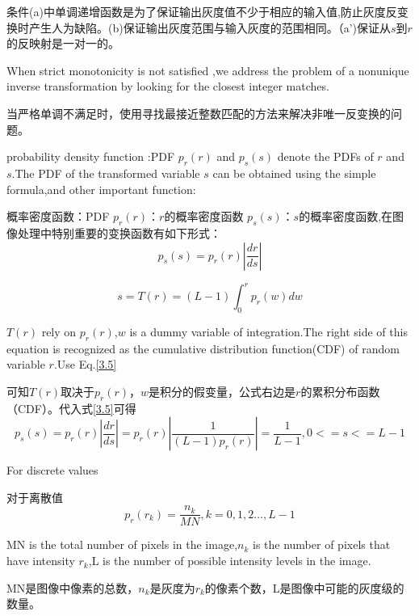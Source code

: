 \documentclass[a4paper,12pt]{article}
\numberwithin{equation}{section}%
\begin{document}
条件(a)中单调递增函数是为了保证输出灰度值不少于相应的输入值,防止灰度反变换时产生人为缺陷。(b)保证输出灰度范围与输入灰度的范围相同。（a')保证从$s$到$r$的反映射是一对一的。

When strict monotonicity is not satisfied ,we address the problem of a nonunique inverse transformation by looking for the closest integer matches.

当严格单调不满足时，使用寻找最接近整数匹配的方法来解决非唯一反变换的问题。

probability density function :PDF  \qquad  $p_{r}(r)$ and $p_{s}(s)$ denote the PDFs of $r$ and $s$.The PDF of the transformed variable $s$ can be obtained using the simple formula,and other important function:

概率密度函数：PDF \qquad $p_{r}(r)$：$r$的概率密度函数 \quad $p_{s}(s)$：$s$的概率密度函数,在图像处理中特别重要的变换函数有如下形式：
\begin{equation}  \label{3.5}  %
 p_{s}(s)=p_{r}(r)\left| \frac{dr}{ds} \right|
\end{equation}

\begin{equation} \label{3.6}   %
 s=T(r)=(L-1)\int_{0}^{r}p_{r}(w)dw 
\end{equation}

$T(r)$ rely on $p_{r}(r)$,$w$ is a dummy variable of integration.The right side of this equation is recognized as the cumulative  distribution function(CDF) of random variable $r$.Use Eq.\ref{3.5}

可知$T(r)$取决于$p_{r}(r)$，$w$是积分的假变量，公式右边是$r$的累积分布函数（CDF）。代入式\ref{3.5}可得
\begin{equation}  \label{3.7}  %
 p_{s}(s)=p_{r}(r)\left| \frac{dr}{ds} \right|=p_{r}(r)\left| \frac{1}{(L-1)p_{r}(r)} \right|=\frac{1}{L-1},0<=s<=L-1
\end{equation}

For discrete values

对于离散值
\begin{equation}    \label{3.8} %
 p_{r}(r_{k})= \frac{n_{k}}{MN},k=0,1,2\ldots,L-1
\end{equation}

MN is the total number of pixels in the image,$n_{k}$ is the number of pixels that have intensity $r_{k}$,L is the number of possible intensity levels in the image.

MN是图像中像素的总数，$n_{k}$是灰度为$r_{k}$的像素个数，L是图像中可能的灰度级的数量。
\end{document}
